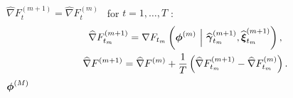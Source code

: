 \begin{algorithm}
\begin{algorithmic}[1]
\begin{gather}
    \end{gather}
    \vspace{10pt}
    \State $\widehat \nabla F_{t}^{(m+1)} = \widehat \nabla F_{t}^{(m)} \enspace$ for $t = 1,\ldots,T$ 
    :
        \begin{gather}
            \widehat \nabla F_{t_m}^{(m+1)} = \nabla F_{t_m}\left(\boldsymbol{\phi}^{(m)} ~ \Big | ~ \widehat {\boldsymbol{\gamma}}_{t_m}^{(m+1)}, \widehat {\boldsymbol{\xi}}_{t_m}^{(m+1)}\right), \\
            \widehat \nabla F^{(m+1)} = \widehat \nabla F^{(m)} + \frac{1}{T} \left( \widehat \nabla F_{t_m}^{(m+1)} - \widehat \nabla F_{t_m}^{(m)}\right).
        \end{gather}
    \EndIf
\EndFor
\State \Return $\boldsymbol{\phi}^{(M)}$
\end{algorithmic}
\end{algorithm}




